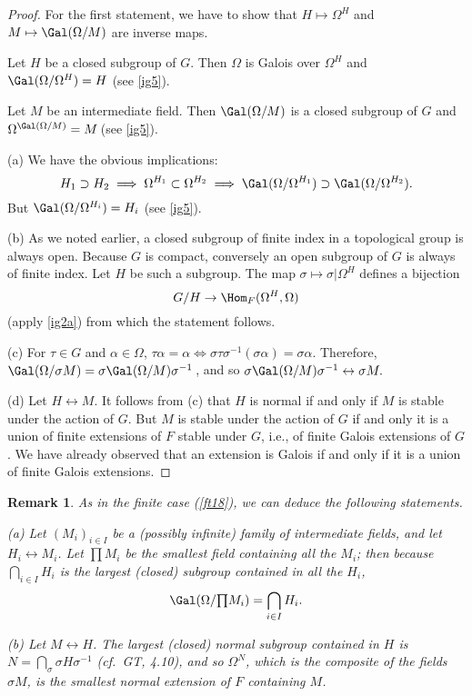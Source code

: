 \documentclass[a4paper,11pt,final,openany]{memoir}
\newtheorem{remark}[X]{Remark}
\theoremstyle{nonumberplain}
\newtheorem{proof}{Proof.}
\begin{document}
\begin{proof}
For the first statement, we have to show that $H\mapsto\Omega^{H}$ and
$M\mapsto\Gal(\Omega/M)$ are inverse maps.

Let $H$ be a closed subgroup of $G$. Then $\Omega$ is Galois over $\Omega^{H}$
and $\Gal(\Omega/\Omega^{H})=H$ (see \ref{ig5}).

Let $M$ be an intermediate field. Then $\Gal(\Omega/M)$ is a closed subgroup
of $G$ and $\Omega^{\Gal(\Omega/M)}=M\,$(see \ref{ig5}).

(a) We have the obvious implications:
\[
H_{1}\supset H_{2}\implies\Omega^{H_{1}}\subset\Omega^{H_{2}}\implies
\Gal(\Omega/\Omega^{H_{1}})\supset\Gal(\Omega/\Omega^{H_{2}}).
\]
But $\Gal(\Omega/\Omega^{H_{i}})=H_{i}$ (see \ref{ig5}).

(b) As we noted earlier, a closed subgroup of finite index in a topological
group is always open. Because $G$ is compact, conversely an open subgroup of
$G$ is always of finite index. Let $H$ be such a subgroup. The map
$\sigma\mapsto\sigma|\Omega^{H}$ defines a bijection%
\[
G/H\rightarrow\Hom_{F}(\Omega^{H},\Omega)
\]
(apply \ref{ig2a}) from which the statement follows.

(c) For $\tau\in G$ and $\alpha\in\Omega$, $\tau\alpha=\alpha\iff\sigma
\tau\sigma^{-1}(\sigma\alpha)=\sigma\alpha$. Therefore, $\Gal(\Omega/\sigma
M)=\sigma\Gal(\Omega/M)\sigma^{-1}\,$, and so $\sigma\Gal(\Omega/M)\sigma
^{-1}\leftrightarrow\sigma M.$

(d) Let $H\leftrightarrow M$. It follows from (c) that $H$ is normal if and
only if $M$ is stable under the action of $G$. But $M$ is stable under the
action of $G$ if and only it is a union of finite extensions of $F$ stable
under $G$, i.e., of finite Galois extensions of $G$. We have already observed
that an extension is Galois if and only if it is a union of finite Galois extensions.
\end{proof}

\begin{remark}
\label{ig7}As in the finite case (\ref{ft18}), we can deduce the following statements.

(a) Let $(M_{i})_{i\in I}$ be a (possibly infinite) family of intermediate
fields, and let $H_{i}\leftrightarrow M_{i}$. Let $%
{\textstyle\prod}
M_{i}$ be the smallest field containing all the $M_{i}$; then because
$\bigcap_{i\in I}H_{i}$ is the largest (closed) subgroup contained in all the
$H_{i}$,%
\[
\Gal(\Omega/%
{\textstyle\prod}
M_{i})=\bigcap_{i\in I}H_{i}.
\]


(b) Let $M\leftrightarrow H$. The largest (closed) normal subgroup contained
in $H$ is $N=\bigcap_{\sigma}\sigma H\sigma^{-1}$ (cf.\ GT, 4.10),
and so $\Omega^{N}$, which is the composite of the fields $\sigma M$, is the
smallest normal extension of $F$ containing $M$.
\end{remark}
\end{document}
